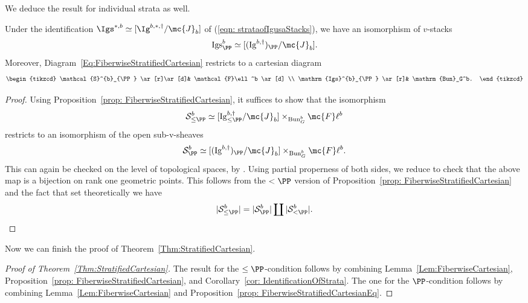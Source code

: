 \documentclass[letterpaper,11pt]{amsart}
\begin{document}
We deduce the result for individual strata as well.
\begin{proposition}\label{prop: FiberwiseStratifiedCartesianEq}
Under the identification $\Igs^{\ast,b}\simeq [\Ig^{b,\ast,\dagger}/\mc{J}_b]$ of (\ref{eqn: strataofIgusaStacks}), we have an isomorphism of $v$-stacks
\[
\mathrm{Igs}^{b}_{\PP}\simeq [(\mathrm{Ig}^{b,\dagger})_{\PP}/\mc{J}_b].
\]
Moreover, Diagram~\eqref{Eq:FiberwiseStratifiedCartesian} restricts to a cartesian diagram
\begin{equation}
\begin{tikzcd}
   \mathcal{S}^{b}_{\PP}  \ar[r]\ar[d]& \mathcal{F}\ell^b \ar[d] \\ 
  \mathrm{Igs}^{b}_{\PP} \ar[r]& \mathrm{Bun}_G^b.
\end{tikzcd}
\end{equation}
\end{proposition}
\begin{proof}
Using Proposition~\ref{prop: FiberwiseStratifiedCartesian}, it suffices to show that the isomorphism
\begin{equation}\label{Eq: CompareNewtonStratumOfBoundaries}
\mathcal{S}^{b}_{\leq\PP}  \simeq {[\mathrm{Ig}^{b,\dagger}_{\leq\PP}/\mc{J}_b]}\times_{\mathrm{Bun}_G^b}\mc{F}\ell^b
\end{equation} 
restricts to an isomorphism of the open sub-v-sheaves
\[ \mathcal{S}^{b}_{\PP}  \simeq {[(\mathrm{Ig}^{b,\dagger})_{\PP}/\mc{J}_b]}\times_{\mathrm{Bun}_G^b}\mc{F}\ell^b.\]
This can again be checked on the level of topological spaces, by \cite[Proposition 11.15]{Ecod}. Using partial properness of both sides, we reduce to check that the above map is a bijection on rank one geometric points. 
This follows from the $<\PP$ version of Proposition~\ref{prop: FiberwiseStratifiedCartesian} and the fact that set theoretically we have 
\[|\mathcal{S}^{b}_{\leq\PP}|=|\mathcal{S}^{b}_{\PP}|\coprod |\mathcal{S}^{b}_{<\PP}|.\]
\end{proof}

Now we can finish the proof of Theorem~\ref{Thm:StratifiedCartesian}.
\begin{proof}[Proof of Theorem~\ref{Thm:StratifiedCartesian}]
    The result for the $\leq \PP$-condition follows by combining Lemma~\ref{Lem:FiberwiseCartesian}, Proposition~\ref{prop: FiberwiseStratifiedCartesian}, and Corollary~\ref{cor: IdentificationOfStrata}. The one for the $\PP$-condition follows by combining Lemma~\ref{Lem:FiberwiseCartesian} and Proposition~\ref{prop: FiberwiseStratifiedCartesianEq}.
\end{proof}
\end{document}
